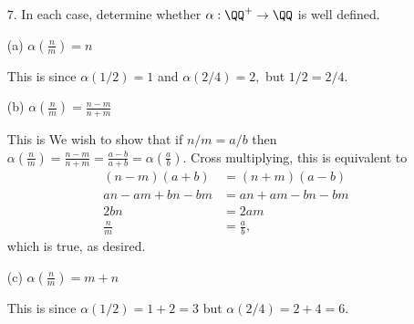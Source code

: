 \documentclass{article}
\begin{document}
\begin{itemize}
\begin{proof}
\begin{enumerate}
				\ii Symmetry: If $a\cong b,$ that means $a\equiv b$ and $a\sim b,$ so then since $\equiv$ and $\sim$ are equivalence relations and therefore symmetric, we have $b\equiv a$ and $b\sim a,$ thus $b\cong a.$

				\ii Transitivity: If $a\cong b$ and $b\cong c,$ that means $a\equiv b, a\sim b,$ and $b\equiv c, b\sim c,$ so since $\equiv$ and $\sim$ are equivalence relations and therefore transitive, we have $a\equiv c, a\sim b,$ thus $a\cong c.$
				\end{enumerate}

				A $\cong$ equivalence class is the set of elements such that all elements in the set are equivalent under both $\equiv$ and $\sim.$

			\end{proof}

	\item[7.] In each case, determine whether $\alpha:\QQ^+\to\QQ$ is well defined.

		(a) $\alpha\left( \frac{n}{m} \right) = n$
			\begin{soln}
				This is  since $\alpha(1/2)=1$ and $\alpha(2/4)=2,$ but $1/2=2/4.$

			\end{soln}

		(b) $\alpha\left( \frac{n}{m} \right)=\frac{n-m}{n+m}$
			\begin{soln}
				This is  We wish to show that if $n/m=a/b$ then $\alpha\left(\frac{n}{m}\right)=\frac{n-m}{n+m}=\frac{a-b}{a+b}=\alpha\left( \frac{a}{b} \right).$ Cross multiplying, this is equivalent to 
				\begin{align*}
					(n-m)(a+b) &= (n+m)(a-b) \\
					an-am+bn-bm &= an+am-bn-bm \\
					2bn &= 2am \\
					\frac{n}{m} &= \frac{a}{b},
				\end{align*} which is true, as desired.

			\end{soln}

		(c) $\alpha\left( \frac{n}{m} \right)=m+n$
			\begin{soln}
				This is  since $\alpha(1/2)=1+2=3$ but $\alpha(2/4)=2+4=6.$

			\end{soln}


\end{itemize}
\end{document}
